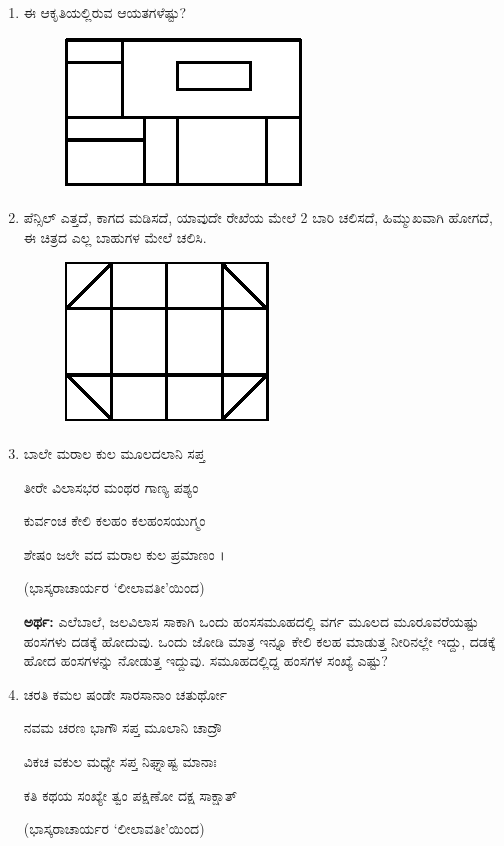 \begin{enumerate}
\item ಈ ಆಕೃತಿಯಲ್ಲಿರುವ ಆಯತಗಳೆಷ್ಟು? 
\begin{figure}[H]
\centering
\includegraphics{images/chap6/q15.eps}
\end{figure}

\item ಪೆನ್ಸಿಲ್ ಎತ್ತದೆ, ಕಾಗದ ಮಡಿಸದೆ, ಯಾವುದೇ ರೇಖೆಯ ಮೇಲೆ 2 ಬಾರಿ ಚಲಿಸದೆ, ಹಿಮ್ಮುಖವಾಗಿ ಹೋಗದೆ, ಈ ಚಿತ್ರದ ಎಲ್ಲ ಬಾಹುಗಳ ಮೇಲೆ ಚಲಿಸಿ. 
\begin{figure}[H]
\centering
\includegraphics{images/chap6/q16.eps}
\end{figure}

\item ಬಾಲೇ ಮರಾಲ ಕುಲ ಮೂಲದಲಾನಿ ಸಪ್ತ 

ತೀರೇ ವಿಲಾಸಭರ ಮಂಥರ ಗಾಣ್ಯ ಪಶ್ಯಂ 

ಕುರ್ವಂಚ ಕೇಲಿ ಕಲಹಂ ಕಲಹಂಸಯುಗ್ಮಂ 

ಶೇಷಂ ಜಲೇ ವದ ಮರಾಲ ಕುಲ ಪ್ರಮಾಣಂ ।

\smallskip
\hfill (ಭಾಸ್ಕರಾಚಾರ್ಯರ `ಲೀಲಾವತೀ'ಯಿಂದ)

\smallskip
{\bf ಅರ್ಥ:} ಎಲೆಬಾಲೆ, ಜಲವಿಲಾಸ ಸಾಕಾಗಿ ಒಂದು ಹಂಸಸಮೂಹದಲ್ಲಿ ವರ್ಗ ಮೂಲದ ಮೂರೂವರೆಯಷ್ಟು ಹಂಸಗಳು ದಡಕ್ಕೆ ಹೋದುವು. ಒಂದು ಜೋಡಿ ಮಾತ್ರ ಇನ್ನೂ ಕೇಲಿ ಕಲಹ ಮಾಡುತ್ತ ನೀರಿನಲ್ಲೇ ಇದ್ದು, ದಡಕ್ಕೆ ಹೋದ ಹಂಸಗಳನ್ನು ನೋಡುತ್ತ ಇದ್ದುವು. ಸಮೂಹದಲ್ಲಿದ್ದ ಹಂಸಗಳ ಸಂಖ್ಯೆ ಎಷ್ಟು? 

\item ಚರತಿ ಕಮಲ ಷಂಡೇ ಸಾರಸಾನಾಂ ಚತುರ್ಥೋ 

ನವಮ ಚರಣ ಭಾಗೌ ಸಪ್ತ ಮೂಲಾನಿ ಚಾದ್ರೌ 

ವಿಕಚ ವಕುಲ ಮಧ್ಯೇ ಸಪ್ತ ನಿಘ್ನಾಷ್ಟ ಮಾನಾಃ 

ಕತಿ ಕಥಯ ಸಂಖ್ಯೇ ತ್ವಂ ಪಕ್ಷಿಣೋ ದಕ್ಷ ಸಾಕ್ಷಾತ್ 

\smallskip
\hfill (ಭಾಸ್ಕರಾಚಾರ್ಯರ `ಲೀಲಾವತೀ'ಯಿಂದ)


\end{enumerate}
